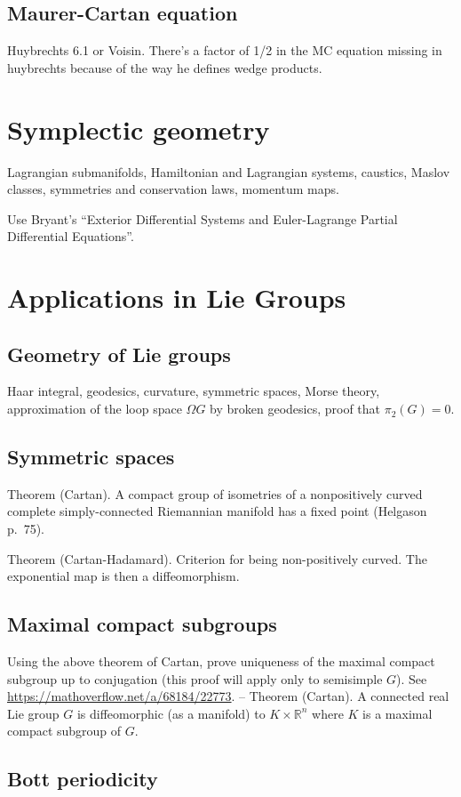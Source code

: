 \section{Maurer-Cartan equation}

Huybrechts 6.1 or Voisin. There's a factor of 1/2 in the MC equation missing in huybrechts because of the way he defines wedge products.




\chapter{Symplectic geometry \texorpdfstring{\ucmark}{}}

Lagrangian submanifolds, Hamiltonian and Lagrangian systems, caustics, Maslov classes, symmetries and conservation laws, momentum maps.

Use Bryant's ``Exterior Differential Systems and Euler-Lagrange Partial Differential Equations''.









\chapter{Applications in Lie Groups \texorpdfstring{\ucmark}{}}


\section{Geometry of Lie groups}
Haar integral, geodesics, curvature, symmetric spaces, Morse theory, approximation of the loop space $\Omega G$ by broken geodesics, proof that $\pi_2(G)=0$.


\section{Symmetric spaces}

Theorem (Cartan). A compact group of isometries of a nonpositively curved complete simply-connected Riemannian manifold has a fixed point (Helgason p.~75).

Theorem (Cartan-Hadamard). Criterion for being non-positively curved. The exponential map is then a diffeomorphism.


\section{Maximal compact subgroups}

Using the above theorem of Cartan, prove uniqueness of the maximal compact subgroup up to conjugation (this proof will apply only to semisimple $G$). See \url{https://mathoverflow.net/a/68184/22773}.
--
Theorem (Cartan). A connected real Lie group $G$ is diffeomorphic (as a manifold) to $K\times\mathbb{R}^n$ where $K$ is a maximal compact subgroup of $G$.


\section{Bott periodicity}



